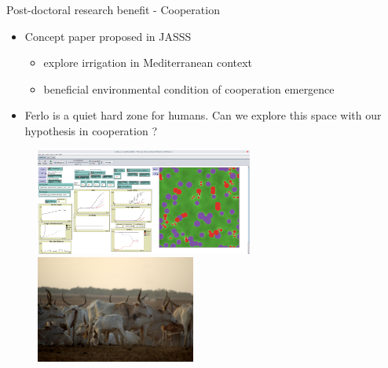 \documentclass[newPxFont]{beamer}
\begin{document}
\begin{frame}[c]{Post-doctoral research benefit - Cooperation}
\vspace{-2em}
\begin{itemize}
  \item Concept paper proposed in JASSS
  \begin{itemize}
    \item explore irrigation in Mediterranean context
    \item beneficial environmental condition of cooperation emergence
  \end{itemize}
  \item Ferlo is a quiet hard zone for humans. Can we explore this space with our hypothesis in cooperation ?
\end{itemize}
\begin{figure}
	\centering
	\includegraphics[height = 3.5cm]{img/Proj42}
  \includegraphics[height = 3.5cm]{img/sng_cow2007}
\end{figure}
\end{frame}
\end{document}
